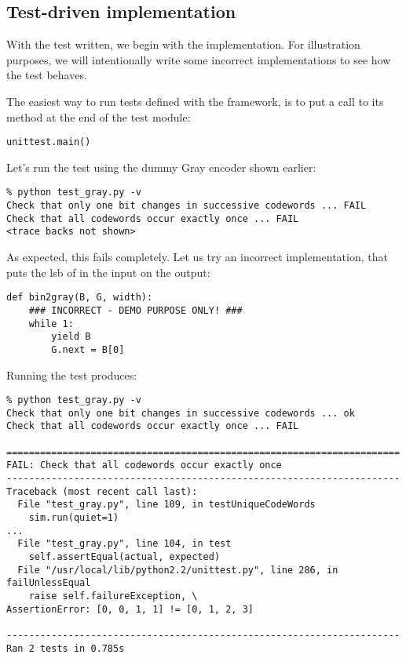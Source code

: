 \subsection{Test-driven implementation \label{unittest-impl}}

With the test written, we begin with the implementation. For
illustration purposes, we will intentionally write some incorrect
implementations to see how the test behaves.

The easiest way to run tests defined with the 
framework, is to put a call to its  method at the end of
the test module:

\begin{verbatim}
unittest.main()
\end{verbatim}

Let's run the test using the dummy Gray encoder shown earlier:

\begin{verbatim}
% python test_gray.py -v
Check that only one bit changes in successive codewords ... FAIL
Check that all codewords occur exactly once ... FAIL
<trace backs not shown>
\end{verbatim}

As expected, this fails completely. Let us try an incorrect
implementation, that puts the lsb of in the input on the output:

\begin{verbatim}
def bin2gray(B, G, width):
    ### INCORRECT - DEMO PURPOSE ONLY! ###
    while 1:
        yield B
        G.next = B[0]
\end{verbatim}


Running the test produces:

\begin{verbatim}
% python test_gray.py -v
Check that only one bit changes in successive codewords ... ok
Check that all codewords occur exactly once ... FAIL

======================================================================
FAIL: Check that all codewords occur exactly once
----------------------------------------------------------------------
Traceback (most recent call last):
  File "test_gray.py", line 109, in testUniqueCodeWords
    sim.run(quiet=1)
...
  File "test_gray.py", line 104, in test
    self.assertEqual(actual, expected)
  File "/usr/local/lib/python2.2/unittest.py", line 286, in failUnlessEqual
    raise self.failureException, \
AssertionError: [0, 0, 1, 1] != [0, 1, 2, 3]

----------------------------------------------------------------------
Ran 2 tests in 0.785s
\end{verbatim}

